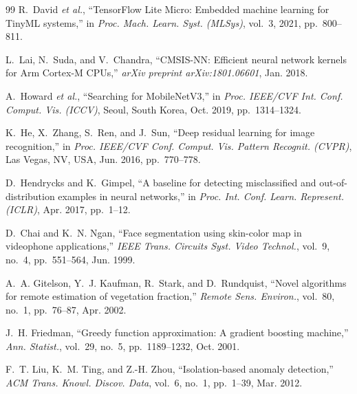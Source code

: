 \documentclass[conference]{IEEEtran}
\begin{document}
\begin{thebibliography}{99}
R.~David \emph{et al.}, ``TensorFlow Lite Micro: Embedded machine learning for TinyML systems,'' in \emph{Proc. Mach. Learn. Syst. (MLSys)}, vol.~3, 2021, pp.~800--811.

L.~Lai, N.~Suda, and V.~Chandra, ``CMSIS-NN: Efficient neural network kernels for Arm Cortex-M CPUs,'' \emph{arXiv preprint arXiv:1801.06601}, Jan. 2018.

A.~Howard \emph{et al.}, ``Searching for MobileNetV3,'' in \emph{Proc. IEEE/CVF Int. Conf. Comput. Vis. (ICCV)}, Seoul, South Korea, Oct. 2019, pp.~1314--1324.

K.~He, X.~Zhang, S.~Ren, and J.~Sun, ``Deep residual learning for image recognition,'' in \emph{Proc. IEEE/CVF Conf. Comput. Vis. Pattern Recognit. (CVPR)}, Las Vegas, NV, USA, Jun. 2016, pp.~770--778.

D.~Hendrycks and K.~Gimpel, ``A baseline for detecting misclassified and out-of-distribution examples in neural networks,'' in \emph{Proc. Int. Conf. Learn. Represent. (ICLR)}, Apr. 2017, pp.~1--12.

D.~Chai and K.~N. Ngan, ``Face segmentation using skin-color map in videophone applications,'' \emph{IEEE Trans. Circuits Syst. Video Technol.}, vol.~9, no.~4, pp.~551--564, Jun. 1999.

A.~A. Gitelson, Y.~J. Kaufman, R.~Stark, and D.~Rundquist, ``Novel algorithms for remote estimation of vegetation fraction,'' \emph{Remote Sens. Environ.}, vol.~80, no.~1, pp.~76--87, Apr. 2002.

J.~H. Friedman, ``Greedy function approximation: A gradient boosting machine,'' \emph{Ann. Statist.}, vol.~29, no.~5, pp.~1189--1232, Oct. 2001.

F.~T. Liu, K.~M. Ting, and Z.-H. Zhou, ``Isolation-based anomaly detection,'' \emph{ACM Trans. Knowl. Discov. Data}, vol.~6, no.~1, pp.~1--39, Mar. 2012.

\end{thebibliography}
\end{document}
